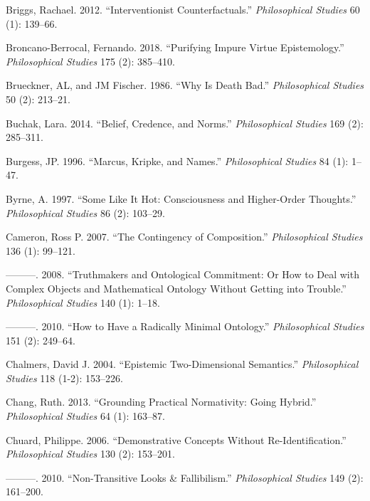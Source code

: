 \documentclass[
  10pt,
  letterpaper,
  DIV=11,
  numbers=noendperiod,
  twoside]{scrartcl}
\newlength{\cslhangindent}
\newenvironment{CSLReferences}[2] %
 {\begin{list}{}{%
  \setlength{\itemindent}{0pt}
  \setlength{\leftmargin}{0pt}
  \setlength{\parsep}{0pt}
  \ifodd #1
   \setlength{\leftmargin}{\cslhangindent}
   \setlength{\itemindent}{-1\cslhangindent}
  \fi
  \setlength{\itemsep}{#2\baselineskip}}}
 {\end{list}}
\begin{document}
\begin{CSLReferences}{1}{0}
Briggs, Rachael. 2012. {``Interventionist Counterfactuals.''}
\emph{Philosophical Studies} 60 (1): 139--66.

Broncano-Berrocal, Fernando. 2018. {``Purifying Impure Virtue
Epistemology.''} \emph{Philosophical Studies} 175 (2): 385--410.

Brueckner, AL, and JM Fischer. 1986. {``Why Is Death Bad.''}
\emph{Philosophical Studies} 50 (2): 213--21.

Buchak, Lara. 2014. {``Belief, Credence, and Norms.''}
\emph{Philosophical Studies} 169 (2): 285--311.

Burgess, JP. 1996. {``Marcus, Kripke, and Names.''} \emph{Philosophical
Studies} 84 (1): 1--47.

Byrne, A. 1997. {``Some Like It Hot: Consciousness and Higher-Order
Thoughts.''} \emph{Philosophical Studies} 86 (2): 103--29.

Cameron, Ross P. 2007. {``The Contingency of Composition.''}
\emph{Philosophical Studies} 136 (1): 99--121.

---------. 2008. {``Truthmakers and Ontological Commitment: Or How to
Deal with Complex Objects and Mathematical Ontology Without Getting into
Trouble.''} \emph{Philosophical Studies} 140 (1): 1--18.

---------. 2010. {``How to Have a Radically Minimal Ontology.''}
\emph{Philosophical Studies} 151 (2): 249--64.

Chalmers, David J. 2004. {``Epistemic Two-Dimensional Semantics.''}
\emph{Philosophical Studies} 118 (1-2): 153--226.

Chang, Ruth. 2013. {``Grounding Practical Normativity: Going Hybrid.''}
\emph{Philosophical Studies} 64 (1): 163--87.

Chuard, Philippe. 2006. {``Demonstrative Concepts Without
Re-Identification.''} \emph{Philosophical Studies} 130 (2): 153--201.

---------. 2010. {``Non-Transitive Looks \& Fallibilism.''}
\emph{Philosophical Studies} 149 (2): 161--200.


\end{CSLReferences}
\end{document}
